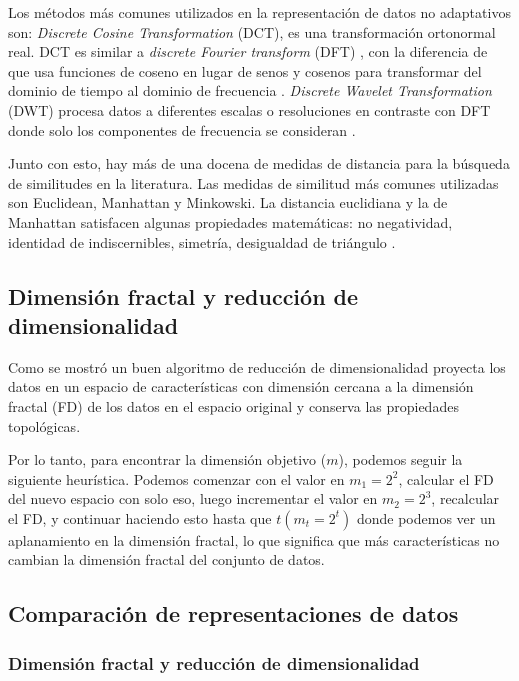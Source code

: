 Los métodos más comunes utilizados en la representación de datos no adaptativos son: \textit{Discrete Cosine Transformation} (DCT), es una transformación ortonormal real. DCT es similar a \textit{discrete Fourier transform} (DFT) \cite{Faloutsos94}, con la diferencia de que usa funciones de coseno en lugar de senos y cosenos para transformar del dominio de tiempo al dominio de frecuencia \cite{Bettaiah14}. \textit{Discrete Wavelet Transformation} (DWT) procesa datos a diferentes escalas o resoluciones en contraste con DFT \cite{Faloutsos94} donde solo los componentes de frecuencia se consideran  \cite{Bettaiah14}.

Junto con esto, hay más de una docena de medidas de distancia para la búsqueda de similitudes en la literatura. Las medidas de similitud más comunes utilizadas son Euclidean, Manhattan y Minkowski. La distancia euclidiana y la de Manhattan satisfacen algunas propiedades matemáticas: no negatividad, identidad de indiscernibles, simetría, desigualdad de triángulo \cite{han2011data}.

\subsection{Dimensión fractal y reducción de dimensionalidad}

Como se mostró \cite{citeulike:fractal:encoders}   un buen algoritmo de reducción de dimensionalidad   proyecta los datos en un espacio de características con dimensión cercana a la dimensión fractal (FD) de los datos en el espacio original y conserva las propiedades topológicas.

Por lo tanto, para encontrar la dimensión objetivo ($ m $), podemos seguir la siguiente heurística. Podemos comenzar con el valor en $ m_1 = 2^2 $, calcular el FD del nuevo espacio con solo eso, luego incrementar el valor en $ m_2 = 2^3 $, recalcular el FD, y continuar haciendo esto hasta que $ t(m_t = 2^t) $ donde podemos ver un aplanamiento en la dimensión fractal, lo que significa que más características no cambian la dimensión fractal del conjunto de datos.
 
\subsection{Comparación de representaciones de datos}
\subsubsection{Dimensión fractal y reducción de dimensionalidad}\label{sec:fractal-dimension}

